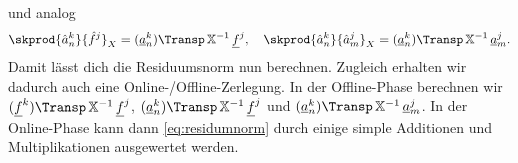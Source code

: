 und analog
\begin{equation}
    \skprod{\hat a^k_n}{\hat f^j}_X = (\underline a^k_n)\Transp \, \mathbb{X}^{-1} \, \underline f^j,
    \quad \skprod{\hat a^k_n}{\hat a^j_m}_X = (\underline a^k_n)\Transp \, \mathbb{X}^{-1} \, \underline a^j_m.
\end{equation}
Damit lässt dich die Residuumsnorm nun berechnen. Zugleich erhalten wir dadurch auch eine Online-/Offline-Zerlegung. In der Offline-Phase berechnen wir $(\underline f^k)\Transp \, \mathbb{X}^{-1} \, \underline f^j$, $(\underline a^k_n)\Transp \, \mathbb{X}^{-1} \, \underline f^j$ und $(\underline a^k_n)\Transp \, \mathbb{X}^{-1} \, \underline a^j_m$. In der Online-Phase kann dann \eqref{eq:residumnorm} durch einige simple Additionen und Multiplikationen ausgewertet werden.



